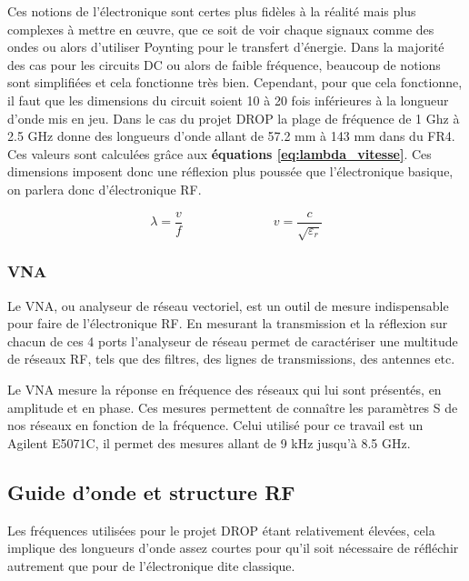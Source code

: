 \documentclass[12pt]{article}
\begin{document}
\vspace{0.5cm}
Ces notions de l'électronique sont certes plus fidèles à la réalité mais plus complexes à mettre en œuvre, que ce soit de voir chaque signaux comme des ondes ou alors d'utiliser Poynting pour le transfert d'énergie. Dans la majorité des cas pour les circuits DC ou alors de faible fréquence, beaucoup de notions sont simplifiées et cela fonctionne très bien. Cependant, pour que cela fonctionne, il faut que les dimensions du circuit soient 10 à 20 fois inférieures à la longueur d'onde mis en jeu. Dans le cas du projet DROP la plage de fréquence de 1 Ghz à 2.5 GHz donne des longueurs d'onde allant de 57.2 mm à 143 mm dans du FR4. Ces valeurs sont calculées grâce aux \textbf{équations \ref{eq:lambda_vitesse}}. Ces dimensions imposent donc une réflexion plus poussée que l'électronique basique, on parlera donc d'électronique RF. 

\vspace{0.5cm}
{\large
\begin{equation}
\lambda = \frac{v}{f} \hspace{3cm} v = \frac{c}{\sqrt{\varepsilon_r}}
\label{eq:lambda_vitesse}
\end{equation}}
\vspace{1cm}

\newpage
\subsubsection{VNA}
Le VNA, ou analyseur de réseau vectoriel, est un outil de mesure indispensable pour faire de l'électronique RF. En mesurant la transmission et la réflexion sur chacun de ces 4 ports l'analyseur de réseau permet de caractériser une multitude de réseaux RF, tels que des filtres, des lignes de transmissions, des antennes etc.

\vspace{0.5cm}
Le VNA mesure la réponse en fréquence des réseaux qui lui sont présentés, en amplitude et en phase. Ces mesures permettent de connaître les paramètres S de nos réseaux en fonction de la fréquence. Celui utilisé pour ce travail est un Agilent E5071C, il permet des mesures allant de 9 kHz jusqu’à 8.5 GHz.

\newpage
\subsection{Guide d'onde et structure RF}
Les fréquences utilisées pour le projet DROP étant relativement élevées, cela implique des longueurs d'onde assez courtes pour qu'il soit nécessaire de réfléchir autrement que pour de l'électronique dite classique.
\end{document}
